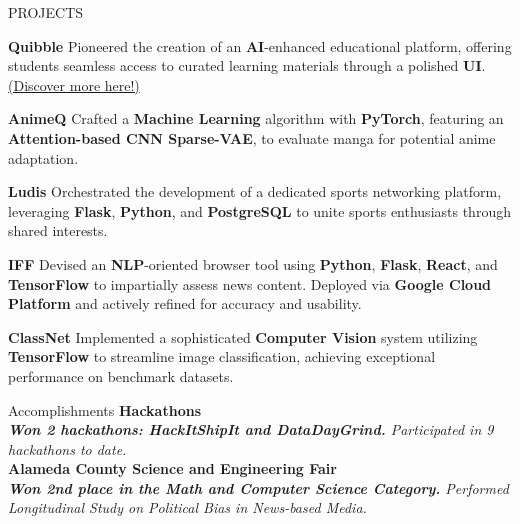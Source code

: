\documentclass{resume} %
\begin{document}
\begin{rSection}{PROJECTS}
\vspace{-1em}


            \item \textbf{Quibble} {Pioneered the creation of an \textbf{AI}-enhanced educational platform, offering students seamless access to curated learning materials through a polished \textbf{UI}.} \href{https://quibble.webflow.io/}{(Discover more here!)}
        
\vspace{-1.75mm}


            \item \textbf{AnimeQ} {Crafted a \textbf{Machine Learning} algorithm with \textbf{PyTorch}, featuring an \textbf{Attention-based CNN Sparse-VAE}, to evaluate manga for potential anime adaptation.}
        
\vspace{-1.75mm}


            \item \textbf{Ludis} {Orchestrated the development of a dedicated sports networking platform, leveraging \textbf{Flask}, \textbf{Python}, and \textbf{PostgreSQL} to unite sports enthusiasts through shared interests.}
        
\vspace{-1.75mm}


            \item \textbf{IFF} {Devised an \textbf{NLP}-oriented browser tool using \textbf{Python}, \textbf{Flask}, \textbf{React}, and \textbf{TensorFlow} to impartially assess news content. Deployed via \textbf{Google Cloud Platform} and actively refined for accuracy and usability.}
        
\vspace{-1.75mm}


            \item \textbf{ClassNet} {Implemented a sophisticated \textbf{Computer Vision} system utilizing \textbf{TensorFlow} to streamline image classification, achieving exceptional performance on benchmark datasets.}
        
\end{rSection} 


\begin{rSection}{Accomplishments} 
\textbf{Hackathons}\\
\textit{\textbf{Won 2 hackathons: HackItShipIt and DataDayGrind.} Participated in 9 hackathons to date. } \\
\textbf{Alameda County Science and Engineering Fair}\\
\textit{\textbf{Won 2nd place in the Math and Computer Science Category.} Performed Longitudinal Study on Political Bias in News-based Media.}

\end{rSection}
\end{document}
